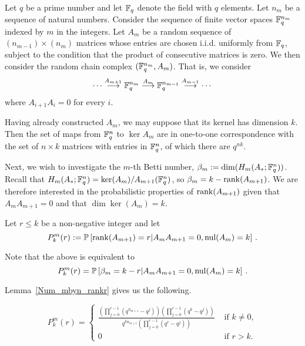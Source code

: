 Let $q$ be a prime number and let $\mathbb{F}_q$ denote the field with $q$ elements. Let $n_m$ be a sequence of natural numbers. Consider the sequence of finite vector spaces $\mathbb{F}_q^{n_m}$ indexed by $m$ in the integers.  Let $A_m$ be a random sequence of $(n_{m-1})\times (n_m)$ matrices whose entries are chosen i.i.d. uniformly from $\mathbb{F}_q$, subject to the condition that the product of consecutive matrices is zero.  We then consider the random chain complex $(\mathbb{F}_q^{n_m},A_m)$. That is, we consider
\[
  \cdots \stackrel{A_{m+1}}{\longrightarrow} \mathbb{F}_q^{n_m} \stackrel{A_m}{\longrightarrow} \mathbb{F}_q^{n_{m-1}} 
  \stackrel{A_{m-1}}{\longrightarrow} \cdots 
\]
where $A_{i+1}A_i=0$ for every $i$. 

Having already constructed $A_{m}$, we may suppose that its kernel has dimension $k$.  Then the set of maps from $\mathbb{F}_q^{n}$ to $\ker A_{m}$ are in one-to-one correspondence with the set of $n\times k$ matrices with entries in $\mathbb{F}_q^{n}$, of which there are $q^{nk}$.

Next, we wish to investigate the $m$-th Betti number, $\beta_m := \dim(H_m(A_\ast; \mathbb{F}_q^{n}))$.  Recall that $H_m(A_\ast;\mathbb{F}_q^{n}) = \ker (A_{m})/ A_{m+1}(\mathbb{F}_q^{n})$, so $\beta_m = k - \operatorname{\mathrm{rank}}(A_{m+1})$.  We are therefore interested in the probabilistic properties of $\operatorname{\mathrm{rank}}(A_{m+1})$ given that $A_{m}A_{m+1} = 0$ and that $\dim\ker(A_{m}) = k$. 

Let $r \leq k$ be a non-negative integer and let 
\[
  P^m_k(r) := \mathbb{P} 
  \left[\operatorname{\mathrm{rank}}(A_{m+1}) = r|A_{m}A_{m+1} = 0, \mathrm{nul}(A_{m}) = k \right] \, .
\]

Note that the above is equivalent to
\[
P^m_k(r) = \mathbb{P}\left[\beta_m = k-r | A_{m}A_{m+1} = 0, \mathrm{nul}(A_{m}) = k\right] \, .
\]

Lemma~\ref{Num_mbyn_rankr} gives us the following.
\begin{lemma}
\[
P^m_k(r) = \begin{cases}
  {\displaystyle \frac{\left(\prod_{j=0}^{r-1}\left(q^{n_{m+1}}-q^{j}\right)\right)
  \left(\prod_{j=0}^{r-1}\left(q^k - q^j \right) \right)}
  {q^{kn_{m+1}} \left(\prod_{j=0}^{r-1} \left(q^r-q^j\right)\right)}}
            					& \textrm{ if } k\neq 0,\\
           0					&  \textrm{ if }  r>k. 
            \end{cases}
\]
\end{lemma}
\\


